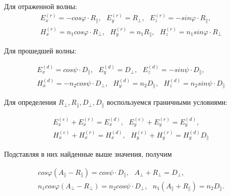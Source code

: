 \documentclass[a4paper]{article}
\begin{document}
Для отраженной волны:
\begin{equation}
\begin{gathered}
E_x^{(r)} = -cos\varphi \cdot R_{\parallel}, \text{     } E_y^{(r)} = R_{\perp}, \text{     } E_z^{(r)} = -sin\varphi \cdot R_{\parallel}, \\
H_x^{(r)} = n_1 cos\varphi \cdot R_{\perp}, \text{     } H_y^{(r)} = n_1 R_{\parallel}, \text{     } H_z^{(r)} = n_1 sin\varphi \cdot R_{\perp}
\end{gathered}
\end{equation}

Для прошедшей волны:

\begin{equation}
\begin{gathered}
E_x^{(d)} = cos\psi \cdot D_{\parallel}, \text{     } E_y^{(d)} = D_{\perp}, \text{      } E_z^{(d)} = -sin\psi \cdot D_{\parallel}, \\

H_x^{(d)} = -n_2 cos\psi \cdot D_{\perp}, \text{     } H_y^{(d)} = n_2 D_{\parallel}, \text{     } H_z^{(d)} = n_2 sin\psi \cdot D_{\parallel}
\end{gathered}
\end{equation}

Для определения $R_{\perp}, R_{\parallel}, D_{\perp}, D_{\parallel}$ воспользуемся граничными условиями:

\begin{equation}
\begin{gathered}
E_x^{(e)} + E_x^{(r)} = E_x^{(d)}, \text{     } E_y^{(e)} + E_y^{(r)} = E_y^{(d)}, \\

H_x^{(e)} + H_x^{(r)} = H_x^{(d)}, \text{     } H_y^{(e)} + H_y^{(r)} = H_y^{(d)} D_{\parallel}
\end{gathered}
\end{equation}

Подставляя в них найденные выше значения, получим

\begin{equation}
\begin{gathered}
cos \varphi(A_{\parallel} - R_{\parallel}) = cos \psi \cdot D_{\parallel}, \text{     } A_{\perp} + R_{\perp} = D_{\perp}, \\

n_1 cos\varphi(A_{\perp} - R_{\perp}) = n_2 cos\psi \cdot D_{\perp}, \text{     } n_1(A_{\parallel} + R_{\parallel}) = n_2 D_{\parallel}.
\end{gathered}
\end{equation}
\end{document}

